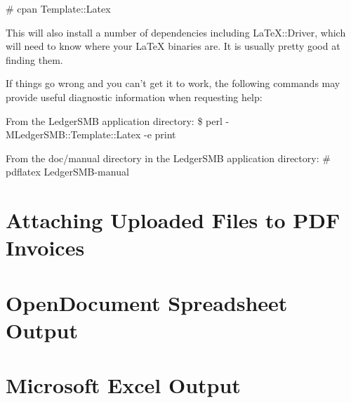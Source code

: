 \# cpan Template::Latex

This will also install a number of dependencies including
LaTeX::Driver, which will need to know where your LaTeX binaries are.
It is usually pretty good at finding them.

If things go wrong and you can't get it to work, the following
commands may provide useful diagnostic information when requesting
help:

From the LedgerSMB application directory:
\$ perl -MLedgerSMB::Template::Latex -e print

From the doc/manual directory in the LedgerSMB application directory:
\# pdflatex LedgerSMB-manual

\section{Attaching Uploaded Files to PDF Invoices}

\section{OpenDocument Spreadsheet Output}

\section{Microsoft Excel Output}


